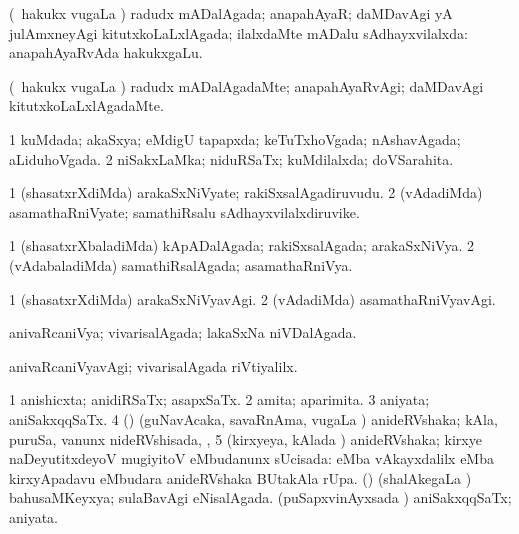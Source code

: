 \bentry
{}
\gl{\gu}
\bmng
(\kanmu\ hakukx \mo vugaLa \vi) radudx mADalAgada; anapahAyaR; daMDavAgi yA julAmxneyAgi kitutxkoLaLxlAgada; ilalxdaMte mADalu sAdhayxvilalxda:  anapahAyaRvAda hakukxgaLu. 
\emng
\eentry

\bentry
{}
\gl{\kirxvi}
\bmng
(\kanmu\ hakukx \mo vugaLa \vi) radudx mADalAgadaMte; anapahAyaRvAgi; daMDavAgi kitutxkoLaLxlAgadaMte. 
\emng
\eentry

\bentry
{}
\gl{\gu}
\bmng
\bnum
\num{1} kuMdada; akaSxya; eMdigU tapapxda; keTuTxhoVgada; nAshavAgada; aLiduhoVgada. 
\num{2} niSakxLaMka; niduRSaTx; kuMdilalxda; doVSarahita. 
\enum
\emng
\eentry

\bentry
{}
\gl{\nA}
\bmng
\bnum
\num{1} (shasatxrXdiMda) arakaSxNiVyate; rakiSxsalAgadiruvudu. 
\num{2} (vAdadiMda) asamathaRniVyate; samathiRsalu sAdhayxvilalxdiruvike. 
\enum
\emng
\eentry

\bentry
{}
\gl{\gu}
\bmng
\bnum
\num{1} (shasatxrXbaladiMda) kApADalAgada; rakiSxsalAgada; arakaSxNiVya. 
\num{2} (vAdabaladiMda) samathiRsalAgada; asamathaRniVya. 
\enum
\emng
\eentry

\bentry
{}
\gl{\kirxvi}
\bmng
\bnum
\num{1} (shasatxrXdiMda) arakaSxNiVyavAgi. 
\num{2} (vAdadiMda) asamathaRniVyavAgi. 
\enum
\emng
\eentry

\bentry
{}
\gl{\gu}
\bmng
anivaRcaniVya; vivarisalAgada; lakaSxNa niVDalAgada. 
\emng
\eentry

\bentry
{}
\gl{\kirxvi}
\bmng
anivaRcaniVyavAgi; vivarisalAgada riVtiyalilx. 
\emng
\eentry

\bentry
{}
\gl{\gu}
\bmng
\bnum
\num{1} anishicxta; anidiRSaTx; asapxSaTx. 
\num{2} amita; aparimita. 
\num{3} aniyata; aniSakxqqSaTx. 
\num{4} (\vAyx) (guNavAcaka, savaRnAma, \mo vugaLa \vi) anideRVshaka; kAla, puruSa, \mo vanunx nideRVshisada, \udA,  
\num{5} (kirxyeya, kAlada \vi) anideRVshaka; kirxye naDeyutitxdeyoV mugiyitoV eMbudanunx sUcisada:  eMba vAkayxdalilx  eMba kirxyApadavu  eMbudara anideRVshaka BUtakAla rUpa. 
 (\savi) 
\banum
{} (shalAkegaLa \vi) bahusaMKeyxya; sulaBavAgi eNisalAgada. 
 (puSapxvinAyxsada \vi) aniSakxqqSaTx; aniyata. 
\eanum
\numie
\enum
\emng
\eentry

